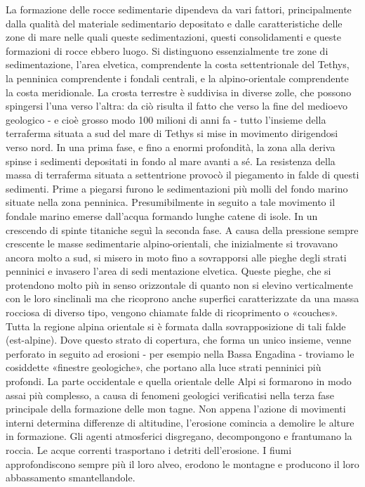\documentclass[a4paper]{article}
\begin{document}
La formazione delle rocce sedimentarie dipendeva da vari fattori, principalmente dalla qualità
del materiale sedimentario depositato e dalle caratteristiche delle zone di mare nelle quali
queste sedimentazioni, questi consolidamenti e queste formazioni di rocce ebbero luogo. Si
distinguono essenzialmente tre zone di sedimentazione, l'area elvetica, comprendente la costa
settentrionale del Tethys, la penninica comprendente i fondali centrali, e la alpino-orientale
comprendente la costa meridionale. La crosta terrestre è suddivisa in diverse zolle, che
possono spingersi l'una verso l'altra: da ciò risulta il fatto che verso la fine del medioevo
geologico - e cioè grosso modo 100 milioni di anni fa - tutto l'insieme della terraferma situata
a sud del mare di Tethys si mise in movimento dirigendosi verso nord.
In una prima fase, e fino a enormi profondità, la zona alla deriva spinse i sedimenti depositati
in fondo al mare avanti a sé. La resistenza della massa di terraferma situata a settentrione
provocò il piegamento in falde di questi sedimenti. Prime a piegarsi furono le sedimentazioni
più molli del fondo marino situate nella zona penninica. Presumibilmente in seguito a tale
movimento il fondale marino emerse dall'acqua formando lunghe catene di isole. In un
crescendo di spinte titaniche seguì la seconda fase. A causa della pressione sempre crescente
le masse sedimentarie alpino-orientali, che inizialmente si trovavano ancora molto a sud, si
misero in moto fino a sovrapporsi alle pieghe degli strati penninici e invasero l'area di sedi
mentazione elvetica. Queste pieghe, che si protendono molto più in senso orizzontale di
quanto non si elevino verticalmente con le loro sinclinali ma che ricoprono anche superfici
caratterizzate da una massa rocciosa di diverso tipo, vengono chiamate falde di ricoprimento
o «couches». Tutta la regione alpina orientale si è formata dalla sovrapposizione di tali falde
(est-alpine). Dove questo strato di copertura, che forma un unico insieme, venne perforato in
seguito ad erosioni - per esempio nella Bassa Engadina - troviamo le cosiddette «finestre
geologiche», che portano alla luce strati penninici più profondi.
La parte occidentale e quella orientale delle Alpi si formarono in modo assai più complesso, a
causa di fenomeni geologici verificatisi nella terza fase principale della formazione delle mon
tagne. Non appena l'azione di movimenti interni determina differenze di altitudine, l'erosione
comincia a demolire le alture in formazione. Gli agenti atmosferici disgregano, decompongono
e frantumano la roccia. Le acque correnti trasportano i detriti dell'erosione. I fiumi
approfondiscono sempre più il loro alveo, erodono le montagne e producono il loro
abbassamento smantellandole.
\end{document}
